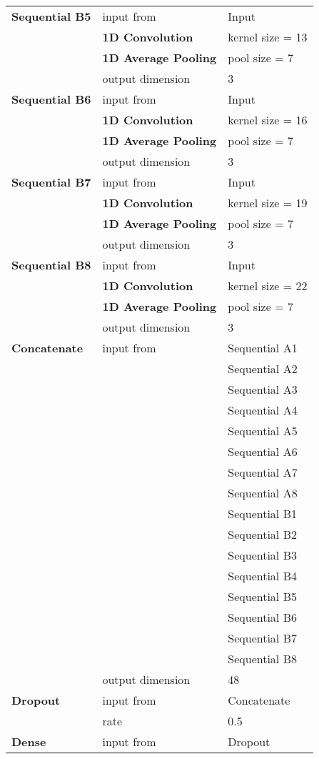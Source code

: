 \begin{tabularx}{\textwidth}[!h]{X X X}
	\textbf{Sequential B5} & input from & Input\\
	& \textbf{1D Convolution} & kernel size = 13\\
	& \textbf{1D Average Pooling} & pool size = 7\\
	& output dimension & 3\\
	[8pt]
	\textbf{Sequential B6} & input from & Input\\
	& \textbf{1D Convolution} & kernel size = 16\\
	& \textbf{1D Average Pooling} & pool size = 7\\
	& output dimension & 3\\
	[8pt]
	\textbf{Sequential B7} & input from & Input\\
	& \textbf{1D Convolution} & kernel size = 19\\
	& \textbf{1D Average Pooling} & pool size = 7\\
	& output dimension & 3\\
	[8pt]
	\textbf{Sequential B8} & input from & Input\\
	& \textbf{1D Convolution} & kernel size = 22\\
	& \textbf{1D Average Pooling} & pool size = 7\\
	& output dimension & 3\\
	[8pt]
	\textbf{Concatenate} & input from & Sequential A1\\
	& & Sequential A2\\
	& & Sequential A3\\
	& & Sequential A4\\
	& & Sequential A5\\
	& & Sequential A6\\
	& & Sequential A7\\
	& & Sequential A8\\
	& & Sequential B1\\
	& & Sequential B2\\
	& & Sequential B3\\
	& & Sequential B4\\
	& & Sequential B5\\
	& & Sequential B6\\
	& & Sequential B7\\
	& & Sequential B8\\
	& output dimension & 48\\
	[8pt]
	\textbf{Dropout} & input from & Concatenate\\
	& rate & 0.5\\
	[8pt]
	\textbf{Dense} & input from & Dropout\\

\end{tabularx}
